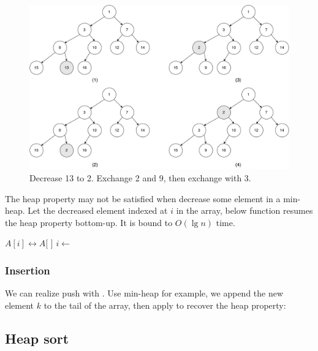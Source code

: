 \documentclass[b5paper]{article}
\begin{document}
\begin{figure}[htbp]
  \centering
  \includegraphics[scale=0.4]{img/decrease-key}
  \caption{Decrease 13 to 2. Exchange 2 and 9, then exchange with 3.}
  \label{fig:decrease-key-2}
\end{figure}

The heap property may not be satisfied when decrease some element in a min-heap. Let the decreased element indexed at $i$ in the array, below function resumes the heap property bottom-up. It is bound to $O(\lg n)$ time.

\begin{algorithmic}[1]
    \State {} $A[i] \leftrightarrow A[$  $]$
    \State $i \gets$  
  \EndWhile
\EndFunction
\end{algorithmic}

\subsubsection{Insertion}
 

We can realize push with  \cite{CLRS}. Use min-heap for example, we append the new element $k$ to the tail of the array, then apply  to recover the heap property:

\begin{algorithmic}[1]
  \State {}
  \State {}
\EndFunction
\end{algorithmic}

\subsection{Heap sort}
\label{heap-sort} 
\end{document}
